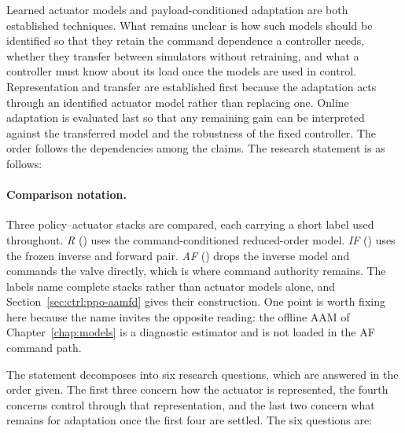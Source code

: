 Learned actuator models and payload-conditioned adaptation are both established
techniques. What remains unclear is how such models should be identified so that
they retain the command dependence a controller needs, whether they transfer
between simulators without retraining, and what a controller must know about its
load once the models are used in control. Representation and transfer are
established first because the adaptation acts through an identified actuator
model rather than replacing one. Online adaptation is evaluated last so that any remaining
gain can be interpreted against the transferred model and the robustness of the
fixed controller. The order follows the dependencies among the claims. The
research statement is as follows:

\paragraph{Comparison notation.}
Three policy--actuator stacks are compared, each carrying a short label used
throughout. \emph{R} (\ppoROMfull) uses the command-conditioned reduced-order
model. \emph{IF} (\ppoIDFDfull) uses the frozen inverse and forward pair.
\emph{AF} (\ppoAAMFDfull) drops the inverse model and commands the valve
directly, which is where command authority remains. The labels name complete stacks rather than actuator models
alone, and Section~\ref{sec:ctrl:ppo-aamfd} gives their construction. One point
is worth fixing here because the name invites the opposite reading: the offline
AAM of Chapter~\ref{chap:models} is a diagnostic estimator and is not loaded in
the AF command path.


The statement decomposes into six research questions, which are answered in the
order given. The first three concern how the actuator is represented, the fourth
concerns control through that representation, and the last two concern what
remains for adaptation once the first four are settled. The six questions are:

